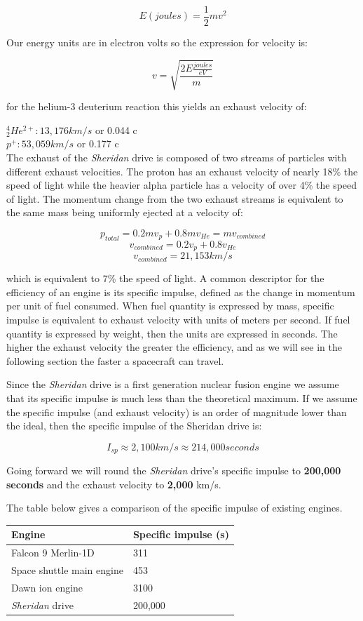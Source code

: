 \documentclass[12pt]{article} %
\begin{document}
$$E (joules) = \frac{1}{2}mv^2$$

Our energy units are in electron volts so the expression for velocity is:

$$v = \sqrt{\frac{2 E \frac{joules}{eV}}{m}}$$

for the helium-3 deuterium reaction this yields an exhaust velocity of:

$^4_2He^{2+}: 13,176 km/s$ or 0.044 c\\
$p^{+}: 53,059 km/s$ or 0.177 c\\

The exhaust of the \textit{Sheridan} drive is composed of two streams of particles with different exhaust velocities. The proton has an exhaust velocity of nearly 18\% the speed of light while the heavier alpha particle has a velocity of over 4\% the speed of light. The momentum change from the two exhaust streams is equivalent to the same mass being uniformly ejected at a velocity of:

$$p_{total} = 0.2mv_{p} + 0.8mv_{He} = mv_{combined}$$
$$v_{combined} = 0.2v_{p} + 0.8v_{He}$$
$$v_{combined} =  21,153km/s$$

which is equivalent to 7\% the speed of light. A common descriptor for the efficiency of an engine is its specific impulse, defined as the change in momentum per unit of fuel consumed.  When fuel quantity is expressed by mass, specific impulse is equivalent to exhaust velocity with units of meters per second. If fuel quantity is expressed by weight, then the units are expressed in seconds. The higher the exhaust velocity the greater the efficiency, and as we will see in the following section the faster a spacecraft can travel.

Since the \textit{Sheridan} drive is a first generation nuclear fusion engine we assume that its specific impulse is much less than the theoretical maximum. If we assume the specific impulse (and exhaust velocity) is an order of magnitude lower than the ideal, then the specific impulse of the Sheridan drive is:

$$I_{sp} \approx 2,100 km/s \approx 214,000 seconds$$

Going forward we will round the \textit{Sheridan} drive's specific impulse to \textbf{200,000 seconds} and the exhaust velocity to \textbf{2,000} km/s.

The table below gives a comparison of the specific impulse of existing engines.

\begin{center}
\begin{tabular}{|m{5 cm}| m{5 cm}|} \hline
\textbf{Engine} & \textbf{Specific impulse (s)}\\ \hline
Falcon 9 Merlin-1D &  311 \\ \hline
Space shuttle main engine &  453 \\ \hline
Dawn ion engine   &  3100\\ \hline
\textit{Sheridan} drive & 200,000\\ \hline
\end{tabular}
\end{center}
\end{document}
